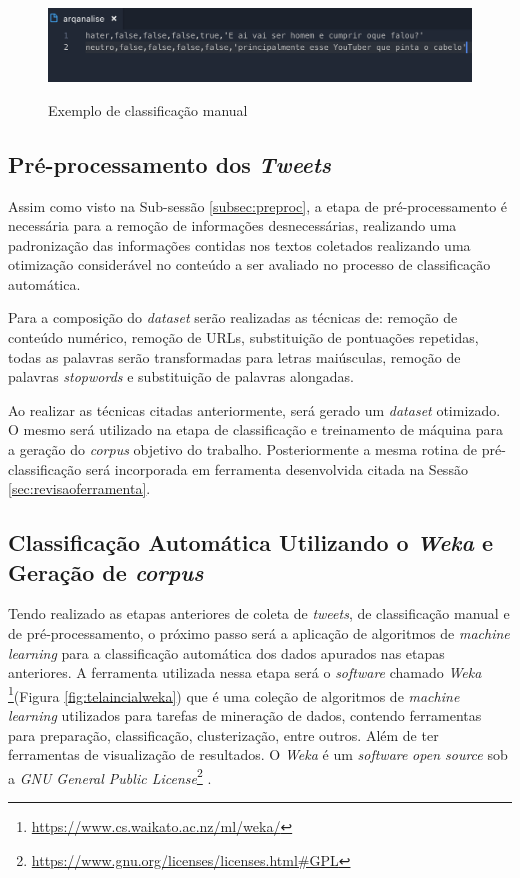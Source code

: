 \begin{figure}[!h]
\centering 
\caption{Exemplo de classificação manual }
\includegraphics[scale=0.60]{imagens/arqanalise.png}
\label{fig:arqanalise}
\end{figure}

\subsection{Pré-processamento dos \textit{Tweets}}
Assim como visto na Sub-sessão \ref{subsec:preproc}, a etapa de pré-processamento é necessária para a remoção de informações desnecessárias, realizando uma padronização das informações contidas nos textos coletados realizando uma otimização considerável no conteúdo a ser avaliado no processo de classificação automática. 

Para a composição do \textit{dataset} serão realizadas as técnicas de: remoção de conteúdo numérico, remoção de URLs, substituição de pontuações repetidas, todas as palavras serão transformadas para letras maiúsculas, remoção de palavras \textit{stopwords} e substituição de palavras alongadas. 

Ao realizar as técnicas citadas anteriormente, será gerado um \textit{dataset} otimizado. O mesmo será utilizado na etapa de classificação e treinamento de máquina para a geração do \textit{corpus} objetivo do trabalho. Posteriormente a mesma rotina de pré-classificação será incorporada em ferramenta desenvolvida citada na Sessão \ref{sec:revisaoferramenta}.

\subsection{Classificação Automática Utilizando o \textit{Weka} e Geração de \textit{corpus}}

Tendo realizado as etapas anteriores de coleta de \textit{tweets}, de classificação manual e de pré-processamento, o próximo passo será a aplicação de algoritmos de \textit{machine learning} para a classificação automática dos dados apurados nas etapas anteriores. A ferramenta utilizada nessa etapa será o \textit{software} chamado \textit{Weka} \footnote{\url{https://www.cs.waikato.ac.nz/ml/weka/}}(Figura \ref{fig:telaincialweka}) que é uma coleção de algoritmos de \textit{machine learning} utilizados para tarefas de mineração de dados, contendo ferramentas para preparação, classificação, clusterização, entre outros.  Além de ter ferramentas de visualização de resultados. O \textit{Weka} é um \textit{software} \textit{open source} sob a \textit{GNU General Public License}\footnote{\url{https://www.gnu.org/licenses/licenses.html\#GPL}} \cite{weka_2018}.

